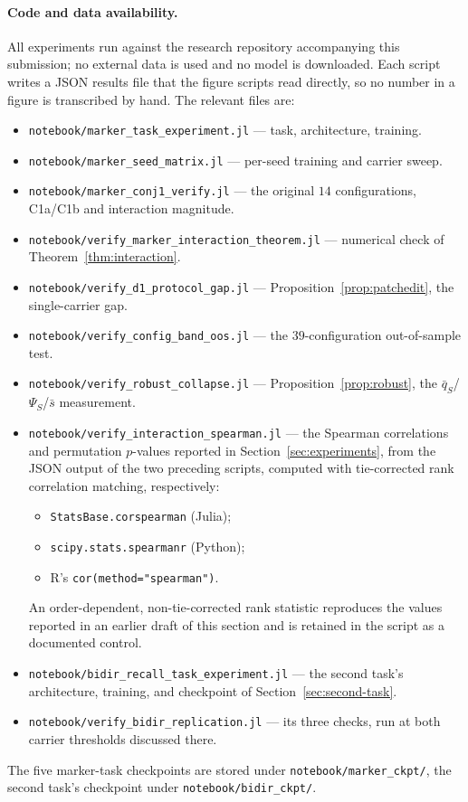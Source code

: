\documentclass[11pt,a4paper]{article}
\begin{document}
\paragraph{Code and data availability.} All experiments run against the
research repository accompanying this submission; no external data is used and
no model is downloaded. Each script writes a JSON results file that the
figure scripts read directly, so no number in a figure is transcribed by
hand. The relevant files are:
\begin{itemize}
\item \texttt{notebook/marker\_task\_experiment.jl} --- task, architecture,
training.
\item \texttt{notebook/marker\_seed\_matrix.jl} --- per-seed training and
carrier sweep.
\item \texttt{notebook/marker\_conj1\_verify.jl} --- the original $14$
configurations, C1a/C1b and interaction magnitude.
\item \texttt{notebook/verify\_marker\_interaction\_theorem.jl} --- numerical
check of Theorem~\ref{thm:interaction}.
\item \texttt{notebook/verify\_d1\_protocol\_gap.jl} ---
Proposition~\ref{prop:patchedit}, the single-carrier gap.
\item \texttt{notebook/verify\_config\_band\_oos.jl} --- the
$39$-configuration out-of-sample test.
\item \texttt{notebook/verify\_robust\_collapse.jl} ---
Proposition~\ref{prop:robust}, the $\bar q_S$/$\Psi_S$/$\bar s$ measurement.
\item \texttt{notebook/verify\_interaction\_spearman.jl} --- the Spearman
correlations and permutation $p$-values reported in Section~\ref{sec:experiments},
from the JSON output of the two preceding scripts, computed with tie-corrected
rank correlation matching, respectively:
\begin{itemize}
\item \texttt{StatsBase.corspearman} (Julia);
\item \texttt{scipy.stats.spearmanr} (Python);
\item R's \texttt{cor(method="spearman")}.
\end{itemize}
An order-dependent,
non-tie-corrected rank statistic reproduces the values reported in an earlier
draft of this section and is retained in the script as a documented control.
\item \texttt{notebook/bidir\_recall\_task\_experiment.jl} --- the second
task's architecture, training, and checkpoint of Section~\ref{sec:second-task}.
\item \texttt{notebook/verify\_bidir\_replication.jl} --- its three checks,
run at both carrier thresholds discussed there.
\end{itemize}
The five marker-task checkpoints are stored under
\texttt{notebook/marker\_ckpt/}, the second task's checkpoint under
\texttt{notebook/bidir\_ckpt/}.
\end{document}

